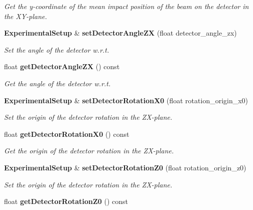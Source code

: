 \begin{DoxyCompactItemize}
\begin{DoxyCompactList}\small\item\em Get the y-\/coordinate of the mean impact position of the beam on the detector in the XY-\/plane. \item\end{DoxyCompactList}\item 
{\bf ExperimentalSetup} \& {\bf setDetectorAngleZX} (float detector\_\-angle\_\-zx)
\begin{DoxyCompactList}\small\item\em Set the angle of the detector w.r.t. \item\end{DoxyCompactList}\item 
float {\bf getDetectorAngleZX} () const 
\begin{DoxyCompactList}\small\item\em Get the angle of the detector w.r.t. \item\end{DoxyCompactList}\item 
{\bf ExperimentalSetup} \& {\bf setDetectorRotationX0} (float rotation\_\-origin\_\-x0)\label{classCALICE_1_1ExperimentalSetup_a6f5c242f1cd5a9d626fac9e46193e7a6}

\begin{DoxyCompactList}\small\item\em Set the origin of the detector rotation in the ZX-\/plane. \item\end{DoxyCompactList}\item 
float {\bf getDetectorRotationX0} () const \label{classCALICE_1_1ExperimentalSetup_a2ff6df503043d3ef5099ea5d6783e8f2}

\begin{DoxyCompactList}\small\item\em Get the origin of the detector rotation in the ZX-\/plane. \item\end{DoxyCompactList}\item 
{\bf ExperimentalSetup} \& {\bf setDetectorRotationZ0} (float rotation\_\-origin\_\-z0)\label{classCALICE_1_1ExperimentalSetup_ab540bcf4caac6b150e0ba91bb84ab432}

\begin{DoxyCompactList}\small\item\em Set the origin of the detector rotation in the ZX-\/plane. \item\end{DoxyCompactList}\item 
float {\bf getDetectorRotationZ0} () const \label{classCALICE_1_1ExperimentalSetup_aa8dbf060db859678b27585ceac86ffe5}


\end{DoxyCompactItemize}

